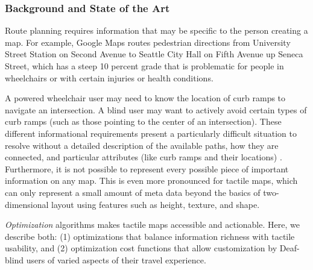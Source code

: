
\subsubsection{Background and State of the Art}

Route planning requires information that may be specific to the person
creating a map. For example, Google Maps routes pedestrian directions
from University Street Station on Second Avenue to Seattle City Hall
on Fifth Avenue up Seneca Street, which has a steep 10 percent grade
that is problematic for people in wheelchairs or with certain injuries
or health conditions. 

A powered wheelchair user may need to know the location of curb ramps to navigate an intersection. A blind user may want to actively avoid certain types of curb ramps (such as those pointing to the center of an intersection). These different informational requirements present a particularly difficult situation to resolve without a detailed description of the available paths, how they are connected, and particular attributes (like curb ramps and their locations) \cite{bolten2017}. Furthermore, it is not possible to represent every possible piece of important information on any map. This is even more pronounced for tactile maps, which can only represent a small amount of meta data beyond the basics of two-dimensional layout using features such as height, texture, and shape. 

\textit{Optimization} algorithms makes tactile maps accessible and actionable.  Here, we describe both: (1) optimizations that balance information richness with tactile usability, and (2) optimization cost functions that allow customization by Deaf-blind users of varied aspects of their travel experience.

